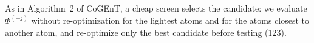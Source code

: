 As in Algorithm~2 of CoGEnT, a cheap screen selects the candidate: we evaluate
$\Phi^{(-j)}$ without re-optimization for the lightest atoms and for the atoms closest to
another atom, and re-optimize only the best candidate before testing (123).

